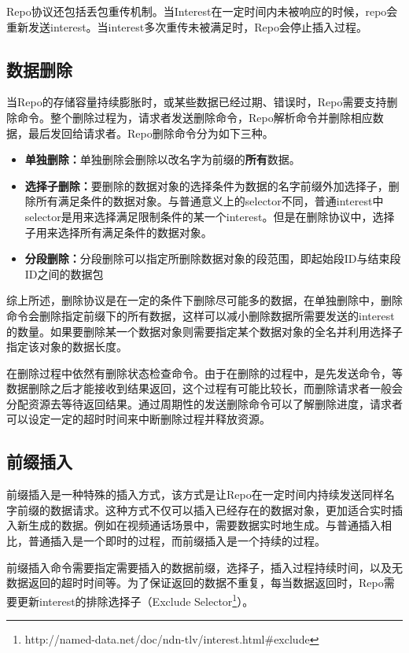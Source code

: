 Repo协议还包括丢包重传机制。当Interest在一定时间内未被响应的时候，repo会重新发送interest。当interest多次重传未被满足时，Repo会停止插入过程。
\subsection{数据删除}
当Repo的存储容量持续膨胀时，或某些数据已经过期、错误时，Repo需要支持删除命令。整个删除过程为，请求者发送删除命令，Repo解析命令并删除相应数据，最后发回给请求者。Repo删除命令分为如下三种。

\begin{itemize}
\item \textbf{单独删除：}单独删除会删除以改名字为前缀的\textbf{所有}数据。
\item \textbf{选择子删除：}要删除的数据对象的选择条件为数据的名字前缀外加选择子，删除所有满足条件的数据对象。与普通意义上的selector不同，普通interest中selector是用来选择满足限制条件的某一个interest。但是在删除协议中，选择子用来选择所有满足条件的数据对象。
\item \textbf{分段删除：}分段删除可以指定所删除数据对象的段范围，即起始段ID与结束段ID之间的数据包
\end{itemize}

综上所述，删除协议是在一定的条件下删除尽可能多的数据，在单独删除中，删除命令会删除指定前缀下的所有数据，这样可以减小删除数据所需要发送的interest的数量。如果要删除某一个数据对象则需要指定某个数据对象的全名并利用选择子指定该对象的数据长度。

在删除过程中依然有删除状态检查命令。由于在删除的过程中，是先发送命令，等数据删除之后才能接收到结果返回，这个过程有可能比较长，而删除请求者一般会分配资源去等待返回结果。通过周期性的发送删除命令可以了解删除进度，请求者可以设定一定的超时时间来中断删除过程并释放资源。

\subsection{前缀插入}
前缀插入是一种特殊的插入方式，该方式是让Repo在一定时间内持续发送同样名字前缀的数据请求。这种方式不仅可以插入已经存在的数据对象，更加适合实时插入新生成的数据。例如在视频通话场景中，需要数据实时地生成。与普通插入相比，普通插入是一个即时的过程，而前缀插入是一个持续的过程。

前缀插入命令需要指定需要插入的数据前缀，选择子，插入过程持续时间，以及无数据返回的超时时间等。为了保证返回的数据不重复，每当数据返回时，Repo需要更新interest的排除选择子（Exclude Selector\footnote{http://named-data.net/doc/ndn-tlv/interest.html\#exclude}）。


